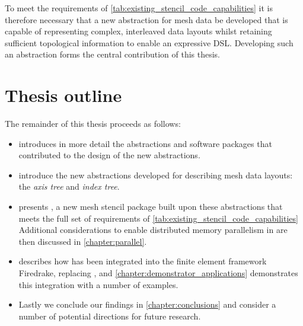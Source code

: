 \documentclass[thesis]{subfiles}
\begin{document}
To meet the requirements of \cref{tab:existing_stencil_code_capabilities} it is therefore necessary that a new abstraction for mesh data be developed that is capable of representing complex, interleaved data layouts whilst retaining sufficient topological information to enable an expressive DSL.
Developing such an abstraction forms the central contribution of this thesis.

\section{Thesis outline}

The remainder of this thesis proceeds as follows:
\begin{itemize}
  \item
     introduces in more detail the abstractions and software packages that contributed to the design of the new abstractions.
  \item
     introduce the new abstractions developed for describing mesh data layouts: the \emph{axis tree} and \emph{index tree}.
  \item
     presents , a new mesh stencil package built upon these abstractions that meets the full set of requirements of \cref{tab:existing_stencil_code_capabilities}
    Additional considerations to enable distributed memory parallelism in  are then discussed in \cref{chapter:parallel}.
  \item {} describes how  has been integrated into the finite element framework Firedrake, replacing , and \cref{chapter:demonstrator_applications} demonstrates this integration with a number of examples.
  \item Lastly we conclude our findings in \cref{chapter:conclusions} and consider a number of potential directions for future research.
\end{itemize}
\end{document}
